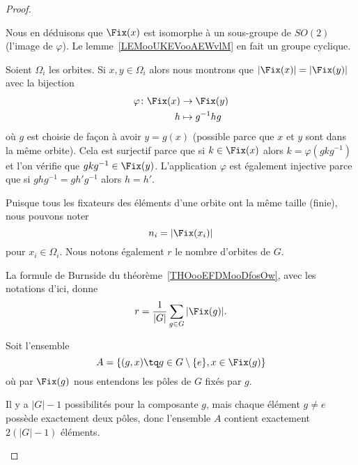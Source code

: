 \begin{proof}
\begin{subproof}
		Nous en déduisons que \( \Fix(x)\) est isomorphe à un sous-groupe de \( SO(2)\) (l'image de \( \varphi\)). Le lemme~\ref{LEMooUKEVooAEWvlM} en fait un groupe cyclique.

		Soient \( \Omega_i\) les orbites. Si \( x,y\in \Omega_i\) alors nous montrons que \( | \Fix(x) |=| \Fix(y) |\) avec la bijection
		\begin{equation}
			\begin{aligned}
				\varphi\colon \Fix(x) & \to \Fix(y)       \\
				h                     & \mapsto g^{-1} hg
			\end{aligned}
		\end{equation}
		où \( g\) est choisie de façon à avoir \( y=g(x)\) (possible parce que \( x\) et \( y\) sont dans la même orbite). Cela est surjectif parce que si \( k\in\Fix(x)\) alors \( k=\varphi(gkg^{-1})\) et l'on vérifie que \( gkg^{-1}\in\Fix(y)\). L'application \( \varphi\) est également injective parce que si \( ghg^{-1}=gh'g^{-1}\) alors \( h=h'\).

		Puisque tous les fixateurs des éléments d'une orbite ont la même taille (finie), nous pouvons noter
		\begin{equation}
			n_i=| \Fix(x_i) |
		\end{equation}
		pour \( x_i\in \Omega_i\). Nous notons également \( r\) le nombre d'orbites de \( G\).

		La formule de Burnside du théorème~\ref{THOooEFDMooDfosOw}, avec les notations d'ici, donne
		\begin{equation}
			r=\frac{1}{ | G | }\sum_{g\in G}| \Fix(g) |.
		\end{equation}

		Soit l'ensemble
		\begin{equation}
			A=\{ (g,x)\tq g\in G\setminus\{ e \}, x\in \Fix(g) \}
		\end{equation}
		où par \( \Fix(g)\) nous entendons les pôles de \( G\) fixés par \( g\).

		Il y a \( | G |-1\) possibilités pour la composante \( g\), mais chaque élément \( g\neq e\) possède exactement deux pôles, donc l'ensemble \( A\) contient exactement \( 2(| G |-1)\) éléments.


\end{subproof}
\end{proof}
